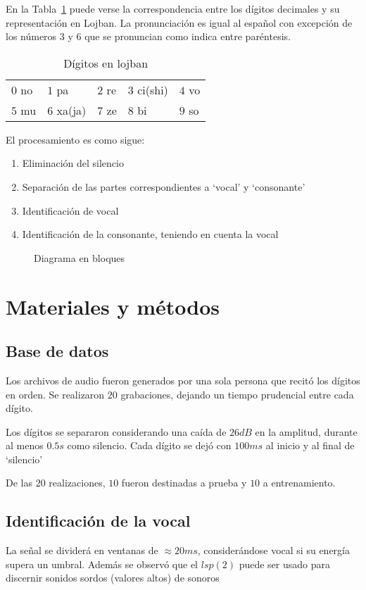 \documentclass[conference,a4paper,10pt,oneside,final]{tfmpd}
\begin{document}
	En la Tabla~\ref{tab:digitos} puede verse la correspondencia entre los dígitos decimales
	y su representación en Lojban. La pronunciación es igual al español
	con excepción de los números $3$ y $6$ que se pronuncian como indica
	entre paréntesis.

	\begin{table}[h]
		\center
		\begin{tabular}{lllll}
			$0$ no & $1$ pa & $2$ re & $3$ ci(shi) & $4$ vo\\
			$5$ mu & $6$ xa(ja) & $7$ ze & $8$ bi & $9$ so\\
		\end{tabular}
		\caption{Dígitos en lojban}
		\label{tab:digitos}
	\end{table}


   	 El procesamiento es como sigue:
   	 \begin{enumerate}
   		 \item Eliminación del silencio
   		 \item Separación de las partes correspondientes a `vocal' y `consonante'
   		 \item Identificación de vocal
   		 \item Identificación de la consonante, teniendo en cuenta la vocal
   	 \end{enumerate}
	 \begin{figure}
		\resizebox{0.5\textwidth}{!}{
			
		}
		\caption{Diagrama en bloques}
	 \end{figure}
	

\section{Materiales y métodos}
	\subsection{Base de datos}
		Los archivos de audio fueron generados por una sola persona que recitó los dígitos en orden.
		Se realizaron $20$ grabaciones, dejando un tiempo prudencial entre cada dígito.

		Los dígitos se separaron considerando una caída de $26dB$ en la amplitud, durante al menos
		$0.5s$ como silencio. Cada dígito se dejó con $100ms$ al inicio y al final de `silencio'

		De las $20$ realizaciones, $10$ fueron destinadas a prueba y $10$ a entrenamiento.


	\subsection{Identificación de la vocal}
		La señal se dividerá en ventanas de $\approx 20ms$, considerándose vocal si 
		su energía supera un umbral. 
		Además se observó que el $lsp(2)$ puede ser usado para discernir sonidos sordos (valores altos) 
		de sonoros
\end{document}
